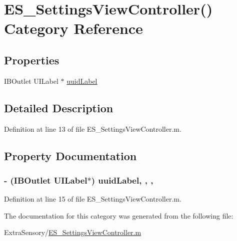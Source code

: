 \hypertarget{category_e_s___settings_view_controller_07_08}{\section{E\+S\+\_\+\+Settings\+View\+Controller() Category Reference}
\label{category_e_s___settings_view_controller_07_08}
}
\subsection*{Properties}
\begin{DoxyCompactItemize}
\item 
I\+B\+Outlet U\+I\+Label $\ast$ \hyperlink{category_e_s___settings_view_controller_07_08_a24697c82b7812a5cc34e51064f3abd7c}{uuid\+Label}
\end{DoxyCompactItemize}


\subsection{Detailed Description}


Definition at line 13 of file E\+S\+\_\+\+Settings\+View\+Controller.\+m.



\subsection{Property Documentation}
\hypertarget{category_e_s___settings_view_controller_07_08_a24697c82b7812a5cc34e51064f3abd7c}{
\subsubsection[{uuid\+Label}]{\setlength{\rightskip}{0pt plus 5cm}-\/ (I\+B\+Outlet U\+I\+Label$\ast$) uuid\+Label\hspace{0.3cm}{\ttfamily [read]}, {\ttfamily [write]}, {\ttfamily [nonatomic]}, {\ttfamily [weak]}}}\label{category_e_s___settings_view_controller_07_08_a24697c82b7812a5cc34e51064f3abd7c}


Definition at line 15 of file E\+S\+\_\+\+Settings\+View\+Controller.\+m.



The documentation for this category was generated from the following file\+:\begin{DoxyCompactItemize}
\item 
Extra\+Sensory/\hyperlink{_e_s___settings_view_controller_8m}{E\+S\+\_\+\+Settings\+View\+Controller.\+m}\end{DoxyCompactItemize}
